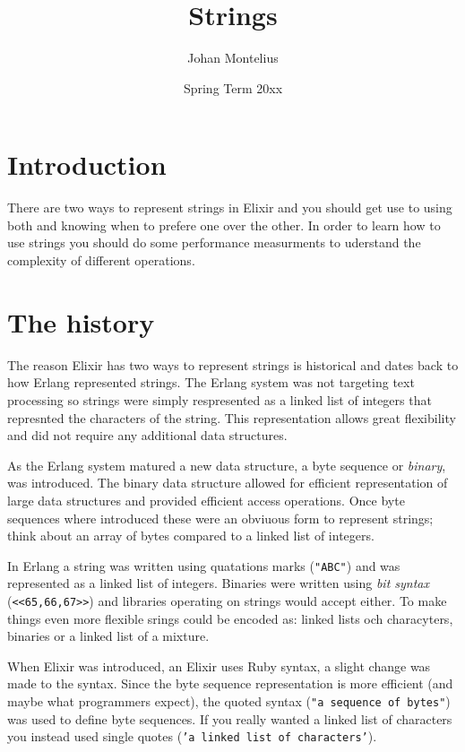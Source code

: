 \documentclass[a4paper,11pt]{article}
\begin{document}
\title{Strings}

\author{Johan Montelius}
\date{Spring Term 20xx}

\maketitle


\section*{Introduction}

There are two ways to represent strings in Elixir and you should get
use to using both and knowing when to prefere one over the other. In
order to learn how to use strings you should do some performance
measurments to uderstand the complexity of different operations.

\section*{The history}

The reason Elixir has two ways to represent strings is historical and
dates back to how Erlang represented strings. The Erlang system was
not targeting text processing so strings were simply respresented as a
linked list of integers that represnted the characters of the
string. This representation allows great flexibility and did not
require any additional data structures.

As the Erlang system matured a new data structure, a byte sequence or
{\em binary}, was introduced. The binary data structure allowed for
efficient representation of large data structures and provided
efficient access operations. Once byte sequences where introduced
these were an obviuous form to represent strings; think about an array
of bytes compared to a linked list of integers.

In Erlang a string was written using quatations marks ({\tt "ABC"})
and was represented as a linked list of integers. Binaries were
written using {\em bit syntax} ({\tt <<65,66,67>>}) and libraries
operating on strings would accept either. To make things even more
flexible srings could be encoded as: linked lists och characyters,
binaries or a linked list of a mixture.

When Elixir was introduced, an Elixir uses Ruby syntax, a slight
change was made to the syntax. Since the byte sequence representation
is more efficient (and maybe what programmers expect), the quoted
syntax ({\tt "a sequence of bytes"}) was used to define byte
sequences. If you really wanted a linked list of characters you
instead used single quotes ({\tt 'a linked list of characters'}).
\end{document}
